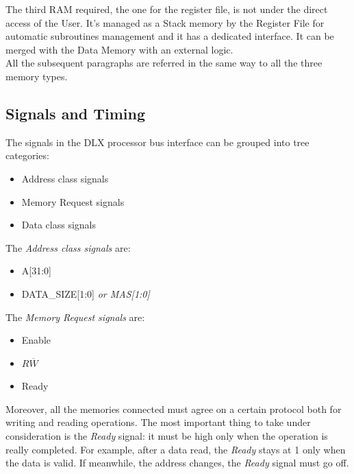 The third RAM required, the one for the register file, is not under the direct access of the User. It's managed as a Stack memory by the Register File for automatic subroutines management and it has a dedicated interface. It can be merged with the Data Memory with an external logic.\\


All the subsequent paragraphs are referred in the same way to all the three memory types.

\subsection{Signals and Timing}
The signals in the DLX processor bus interface can be grouped into tree categories:
\begin{itemize}
    \item Address class signals
    \item Memory Request signals
    \item Data class signals
\end{itemize}

The \emph{Address class signals} are:
\begin{itemize}
    \item A{[31:0]}
    \item DATA\_SIZE{[1:0]} \emph{or MAS{[1:0]}}
\end{itemize}

The \emph{Memory Request signals} are:
\begin{itemize}
    \item Enable
    \item $R\overline{W}$
    \item Ready
\end{itemize}

Moreover, all the memories connected must agree on a certain protocol both for writing and reading operations. The most important thing to take under consideration is the \emph{Ready} signal: it must be high only when the operation is really completed. For example, after a data read, the \emph{Ready} stays at 1 only when the data is valid. If meanwhile, the address changes, the \emph{Ready} signal must go off.

